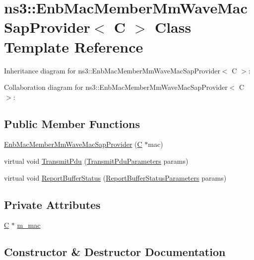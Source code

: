 \hypertarget{classns3_1_1EnbMacMemberMmWaveMacSapProvider}{}\section{ns3\+:\+:Enb\+Mac\+Member\+Mm\+Wave\+Mac\+Sap\+Provider$<$ C $>$ Class Template Reference}
\label{classns3_1_1EnbMacMemberMmWaveMacSapProvider}


Inheritance diagram for ns3\+:\+:Enb\+Mac\+Member\+Mm\+Wave\+Mac\+Sap\+Provider$<$ C $>$\+:


Collaboration diagram for ns3\+:\+:Enb\+Mac\+Member\+Mm\+Wave\+Mac\+Sap\+Provider$<$ C $>$\+:
\subsection*{Public Member Functions}
\begin{DoxyCompactItemize}
\item 
\hyperlink{classns3_1_1EnbMacMemberMmWaveMacSapProvider_a266f5ed911751c9fa291ed3cd0c3c8ce}{Enb\+Mac\+Member\+Mm\+Wave\+Mac\+Sap\+Provider} (\hyperlink{loss__COST231__small__cities__urban_8m_aaa53ca0b650dfd85c4f59fa156f7a2cc}{C} $\ast$mac)
\item 
virtual void \hyperlink{classns3_1_1EnbMacMemberMmWaveMacSapProvider_a3aabadfbbe4a0051ef717b1136219b07}{Transmit\+Pdu} (\hyperlink{structns3_1_1LteMacSapProvider_1_1TransmitPduParameters}{Transmit\+Pdu\+Parameters} params)
\item 
virtual void \hyperlink{classns3_1_1EnbMacMemberMmWaveMacSapProvider_a7a16f6b8a2b44400feb4d62d38bb96c2}{Report\+Buffer\+Status} (\hyperlink{structns3_1_1LteMacSapProvider_1_1ReportBufferStatusParameters}{Report\+Buffer\+Status\+Parameters} params)
\end{DoxyCompactItemize}
\subsection*{Private Attributes}
\begin{DoxyCompactItemize}
\item 
\hyperlink{loss__COST231__small__cities__urban_8m_aaa53ca0b650dfd85c4f59fa156f7a2cc}{C} $\ast$ \hyperlink{classns3_1_1EnbMacMemberMmWaveMacSapProvider_a35f574b07a965a713da5bb15efdd74fa}{m\+\_\+mac}
\end{DoxyCompactItemize}


\subsection{Constructor \& Destructor Documentation}
